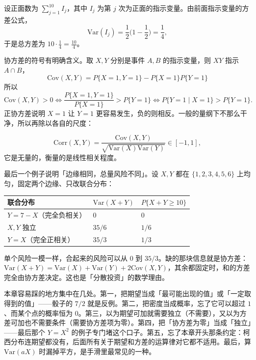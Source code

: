 \begin{example}[十次抛硬币的正面数]
设正面数为 $\sum_{j=1}^{10}I_j$，其中 $I_j$ 为第 $j$ 次为正面的指示变量。由前面指示变量的方差公式，
\[
\mathrm{Var}(I_j)=\frac12\Big(1-\frac12\Big)=\frac14,
\]
于是总方差为 $10\cdot\frac14=\frac{10}{4}$。
\end{example}

协方差的符号有明确含义。取 $X,Y$ 分别是事件 $A,B$ 的指示变量，则 $XY$ 指示 $A\cap B$，
\[
\mathrm{Cov}(X,Y)=P\{X=1,Y=1\}-P\{X=1\}P\{Y=1\}
\]
所以
\[
\mathrm{Cov}(X,Y)>0
\iff
\frac{P\{X=1,Y=1\}}{P\{X=1\}}>P\{Y=1\}
\iff
P\{Y=1\mid X=1\}>P\{Y=1\}.
\]
正协方差说明 $X=1$ 让 $Y=1$ 更容易发生，负的则相反。一般的量纲下不那么干净，所以再除以各自的尺度：

\begin{definition}[相关系数]
\[
\mathrm{Corr}(X,Y)=\frac{\mathrm{Cov}(X,Y)}{\sqrt{\mathrm{Var}(X)\mathrm{Var}(Y)}}\in[-1,1],
\]
它是无量的，衡量的是线性相关程度。
\end{definition}

最后一个例子说明「边缘相同，总量风险不同」。设 $X,Y$ 都在 $\{1,2,3,4,5,6\}$ 上均匀，固定两个边缘、只改联合分布：

\begin{example}[耦合]
\begin{center}
\begin{tabular}{lll}
\hline
联合分布 & $\mathrm{Var}(X+Y)$ & $P\{X+Y\ge 10\}$\\
\hline
$Y=7-X$（完全负相关） & $0$ & $0$\\
$X,Y$ 独立 & $35/6$ & $1/6$\\
$Y=X$（完全正相关） & $35/3$ & $1/3$\\
\hline
\end{tabular}
\end{center}
\end{example}

单个风险一模一样，合起来的风险可以从 $0$ 到 $35/3$。缺的那块信息就是协方差：$\mathrm{Var}(X+Y)=\mathrm{Var}(X)+\mathrm{Var}(Y)+2\mathrm{Cov}(X,Y)$，其余都固定时，和的方差完全由协方差决定。这也是「分散投资」的数学理由。

本章容易踩的地方集中在几处。第一，把期望当成「最可能出现的值」或「一定取得到的值」——骰子的 $7/2$ 就是反例。第二，把密度当成概率，忘了它可以超过 $1$、而某个点的概率恒为 $0$。第三，以为期望可加就需要独立（不需要），又以为方差可加也不需要条件（需要协方差项为零）。第四，把「协方差为零」当成「独立」——最后那个 $Y=X^2$ 的例子专门堵这个口子。第五，忘了本章开头那条约定：柯西分布连期望都没有，后面所有关于期望和方差的运算律对它都不适用。最后，算 $\mathrm{Var}(aX)$ 时漏掉平方，是手滑里最常见的一种。
